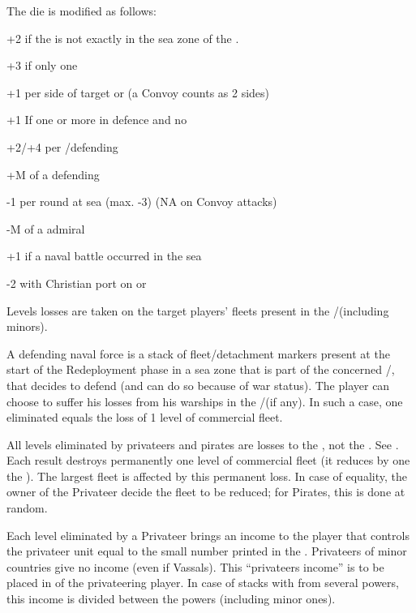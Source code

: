 \bparag The die is modified as follows:
\begin{modlist}
\item[+2] if the \corsaire is not exactly in the sea zone of the \STZ.
\item[+3] if only one \corsaire\facemoins
\item[+1] per side of target \TradeFLEET or \FLEET (a Convoy counts as 2
  sides)
\item[+1] If one or more \ND in defence and no \FLEET
\item[+2/+4] per \FLEET\facemoins/\Faceplus defending
\item[+M] \Man of a defending \LeaderA
\item[-1] per round at sea (max. -3) (NA on Convoy attacks)
\item[-M] \Man of a \corsaire admiral %
\item[+1] if a naval battle occurred in the sea %
\item[-2]  with Christian port on  or
\end{modlist}
\bparag Levels losses are taken on the target players' fleets present in the
\STZ/\CTZ (including minors).

 A defending naval force is a stack of
fleet/detachment markers present at the start of the Redeployment phase in a
sea zone that is part of the concerned \STZ/\CTZ, that decides to defend (and
can do so because of war status).
\bparag The player can choose to suffer his losses from his warships in the
\STZ/\CTZ (if any). In such a case, one eliminated \ND equals the loss of 1
level of commercial fleet.

 All levels eliminated by privateers and pirates
are losses to the , not the . See
.
\bparag Each \textetoile result destroys permanently one level of commercial
fleet (it reduces by one the ).  The largest fleet is
affected by this permanent loss. In case of equality, the owner of the
Privateer decide the fleet to be reduced; for Pirates, this is done at random.

 Each level eliminated by a Privateer brings an
income to the player that controls the privateer unit equal to the small
number printed in the \STZ. Privateers of minor countries give no income (even
if Vassals).
\bparag This ``privateers income'' is to be placed in  of the privateering player.
\bparag In case of stacks with \corsaire from several powers, this income is
divided between the powers (including minor ones).

